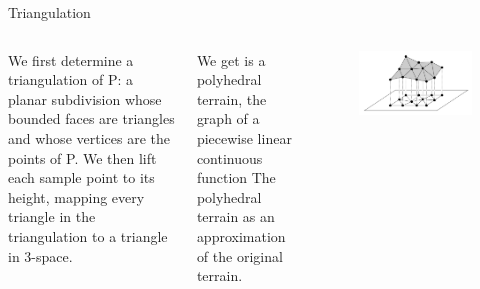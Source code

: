 \begin{frame}{Triangulation}

    \begin{columns}
    We first determine a triangulation of P: a
    planar subdivision whose bounded faces are
    triangles and whose vertices are the points of
    P. We then lift each sample point to its height,
    mapping every triangle in the triangulation to
    a triangle in 3-space.
    
    We get is a polyhedral terrain, the graph of a
    piecewise linear continuous function
    The polyhedral terrain as an approximation of
    the original terrain.    
    	\begin{figure}
    	    \centering
    	    \includegraphics[width=\textwidth]{figs/L07-terrain-map-2.png}
    	\end{figure}
    \end{columns}

\end{frame}



